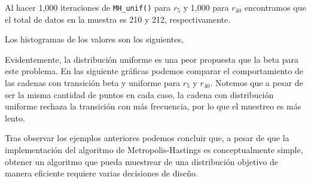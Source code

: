 \documentclass{article}
\begin{document}
\begin{enumerate}
    Al hacer 1,000 iteraciones de \texttt{MH\_unif()} para $r_5$ y 1,000 para $r_{40}$ encontramos
    que el total de datos en la muestra es 210 y 212, respectivamente. 

    Los histogramas de los valores son los siguientes,

    Evidentemente, la distribución uniforme es una peor propuesta que la beta para este problema.
    En las siguiente gráficas podemos comparar el comportamiento de las cadenas con transición beta y
    uniforme para $r_5$ y $r_{40}$. Notemos que a pesar de ser la misma cantidad de puntos en cada caso,
    la cadena con distribución uniforme rechaza la transición con más frecuencia, por lo que el 
    muestreo es más lento.

    Tras observar los ejemplos anteriores podemos concluir que, a pesar de que la implementación del
    algoritmo de Metropolis-Hastings es conceptualmente simple, obtener un algoritmo que pueda muestrear
    de una distribución objetivo de manera eficiente requiere varias decisiones de diseño.
   
\end{enumerate}




 
\end{document}

